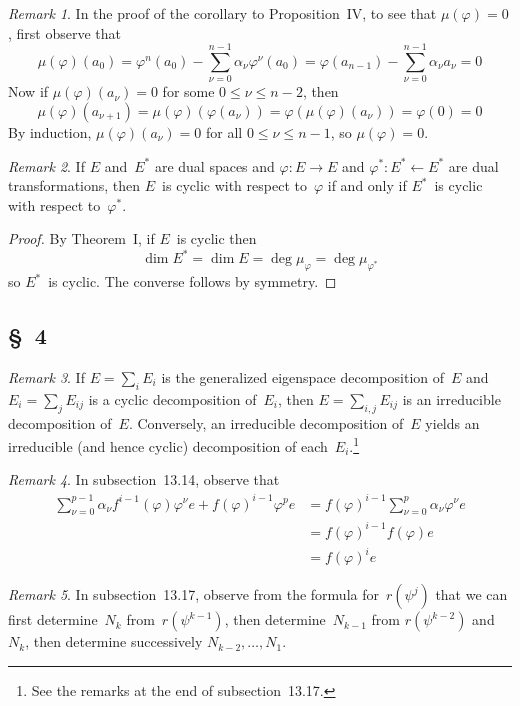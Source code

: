 \documentclass[letterpaper,12pt]{article}
\newcommand{\from}{\leftarrow}
\theoremstyle{definition}
\theoremstyle{remark}
\newtheorem*{rmk}{Remark}
\begin{document}
\begin{rmk}
In the proof of the corollary to Proposition~IV, to see that \(\mu(\varphi)=0\), first observe that
\[\mu(\varphi)(a_0)=\varphi^n(a_0)-\sum_{\nu=0}^{n-1}\alpha_{\nu}\varphi^{\nu}(a_0)=\varphi(a_{n-1})-\sum_{\nu=0}^{n-1}\alpha_{\nu}a_{\nu}=0\]
Now if \(\mu(\varphi)(a_{\nu})=0\) for some \(0\le\nu\le n-2\), then
\[\mu(\varphi)(a_{\nu+1})=\mu(\varphi)(\varphi(a_{\nu}))=\varphi(\mu(\varphi)(a_{\nu}))=\varphi(0)=0\]
By induction, \(\mu(\varphi)(a_{\nu})=0\) for all \(0\le\nu\le n-1\), so \(\mu(\varphi)=0\).
\end{rmk}

\begin{rmk}
If \(E\) and~\(E^*\) are dual spaces and \(\varphi:E\to E\) and \(\varphi^*:E^*\from E^*\) are dual transformations, then \(E\)~is cyclic with respect to~\(\varphi\) if and only if \(E^*\)~is cyclic with respect to~\(\varphi^*\).
\end{rmk}
\begin{proof}
By Theorem~I, if \(E\)~is cyclic then
\[\dim E^*=\dim E=\deg\mu_{\varphi}=\deg\mu_{\varphi^*}\]
so \(E^*\)~is cyclic. The converse follows by symmetry.
\end{proof}

\subsection*{\S~4}
\begin{rmk}
If \(E=\sum_i E_i\) is the generalized eigenspace decomposition of~\(E\) and \(E_i=\sum_j E_{ij}\) is a cyclic decomposition of~\(E_i\), then \(E=\sum_{i,j}E_{ij}\) is an irreducible decomposition of~\(E\). Conversely, an irreducible decomposition of~\(E\) yields an irreducible (and hence cyclic) decomposition of each~\(E_i\).\footnote{See the remarks at the end of subsection~13.17.}
\end{rmk}

\begin{rmk}
In subsection~13.14, observe that
\begin{align*}
\sum_{\nu=0}^{p-1}\alpha_{\nu}f^{i-1}(\varphi)\varphi^{\nu}e+f(\varphi)^{i-1}\varphi^pe&=f(\varphi)^{i-1}\sum_{\nu=0}^p\alpha_{\nu}\varphi^{\nu}e\\
	&=f(\varphi)^{i-1}f(\varphi)e\\
	&=f(\varphi)^ie
\end{align*}
\end{rmk}

\begin{rmk}
In subsection~13.17, observe from the formula for~\(r(\psi^j)\) that we can first determine~\(N_k\) from~\(r(\psi^{k-1})\), then determine~\(N_{k-1}\) from \(r(\psi^{k-2})\) and~\(N_k\), then determine successively \(N_{k-2},\ldots,N_1\).
\end{rmk}
\end{document}
